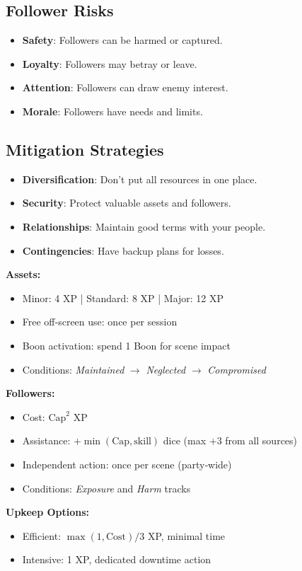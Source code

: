 \subsection*{Follower Risks}
\label{sec:follower-risks-list}
\begin{itemize}
\item \textbf{Safety}: Followers can be harmed or captured.
\item \textbf{Loyalty}: Followers may betray or leave.
\item \textbf{Attention}: Followers can draw enemy interest.
\item \textbf{Morale}: Followers have needs and limits.
\end{itemize}

\subsection*{Mitigation Strategies}
\label{sec:risk-mitigation}
\begin{itemize}
\item \textbf{Diversification}: Don’t put all resources in one place.
\item \textbf{Security}: Protect valuable assets and followers.
\item \textbf{Relationships}: Maintain good terms with your people.
\item \textbf{Contingencies}: Have backup plans for losses.
\end{itemize}

\begin{tcolorbox}[colback=blue!5!white,colframe=blue!75!black,title={Assets and Followers Quick Reference},fonttitle=\bfseries]
\textbf{Assets:}
\begin{itemize}
\item Minor: 4 XP \;|\; Standard: 8 XP \;|\; Major: 12 XP
\item Free off‑screen use: once per session
\item Boon activation: spend 1 Boon for scene impact
\item Conditions: \emph{Maintained} $\rightarrow$ \emph{Neglected} $\rightarrow$ \emph{Compromised}
\end{itemize}

\textbf{Followers:}
\begin{itemize}
\item Cost: $\text{Cap}^2$ XP
\item Assistance: $+\min(\text{Cap},\text{skill})$ dice (max +3 from all sources)
\item Independent action: once per scene (party‑wide)
\item Conditions: \emph{Exposure} and \emph{Harm} tracks
\end{itemize}

\textbf{Upkeep Options:}
\begin{itemize}
\item Efficient: $\max(1,\text{Cost})/3$ XP, minimal time
\item Intensive: 1 XP, dedicated downtime action
\end{itemize}
\end{tcolorbox}

